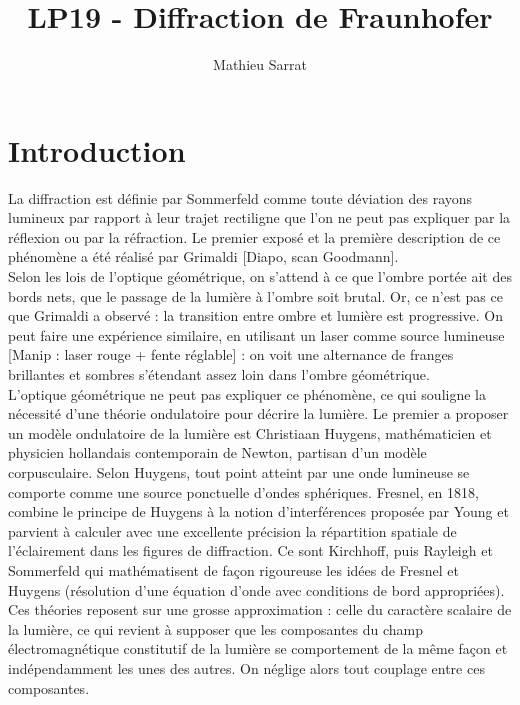 \documentclass[11pt,a4paper]{report}
\author{Mathieu Sarrat}
\title{LP19 - Diffraction de Fraunhofer}
\begin{document}
\maketitle

\section*{Introduction}

La diffraction est définie par Sommerfeld comme toute déviation des rayons lumineux par rapport à leur trajet rectiligne que l'on ne peut pas expliquer par la réflexion ou par la réfraction. Le premier exposé et la première description de ce phénomène a été réalisé par Grimaldi [Diapo, scan Goodmann].\\

Selon les lois de l'optique géométrique, on s'attend à ce que l'ombre portée ait des bords nets, que le passage de la lumière à l'ombre soit brutal. Or, ce n'est pas ce que Grimaldi a observé : la transition entre ombre et lumière est progressive. On peut faire une expérience similaire, en utilisant un laser comme source lumineuse [Manip : laser rouge + fente réglable] : on voit une alternance de franges brillantes et sombres s'étendant assez loin dans l'ombre géométrique.\\

L'optique géométrique ne peut pas expliquer ce phénomène, ce qui souligne la nécessité d'une théorie ondulatoire pour décrire la lumière. Le premier a proposer un modèle ondulatoire de la lumière est Christiaan Huygens, mathématicien et physicien hollandais contemporain de Newton, partisan d'un modèle corpusculaire. Selon Huygens, tout point atteint par une onde lumineuse se comporte comme une source ponctuelle d'ondes sphériques. Fresnel, en 1818, combine le principe de Huygens à la notion d'interférences proposée par Young et parvient à calculer avec une excellente précision la répartition spatiale de l'éclairement dans les figures de diffraction. Ce sont Kirchhoff, puis Rayleigh et Sommerfeld qui mathématisent de façon rigoureuse les idées de Fresnel et Huygens (résolution d'une équation d'onde avec conditions de bord appropriées). Ces théories reposent sur une grosse approximation : celle du caractère scalaire de la lumière, ce qui revient à supposer que les composantes du champ électromagnétique constitutif de la lumière se comportement de la même façon et indépendamment les unes des autres. On néglige alors tout couplage entre ces composantes.\\ 
\end{document}
